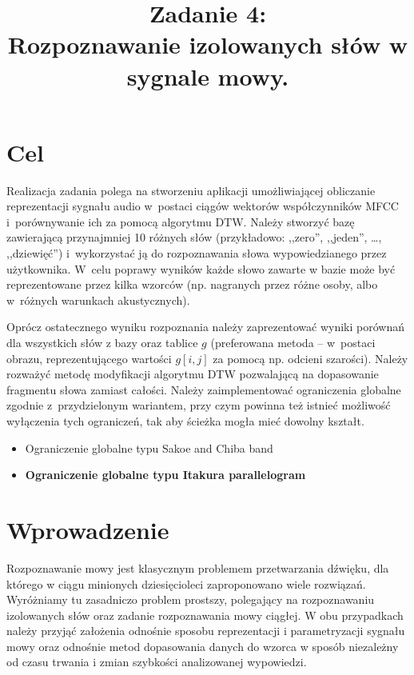 \documentclass{classrep}
\author{
  \studentinfo{Paweł Musiał}{178726} \and
  \studentinfo{Łukasz Michalski}{178724}
}
\title{Zadanie 4:\\  \textbf {Rozpoznawanie izolowanych słów w sygnale mowy.}}
\begin{document}
\maketitle

\addtocounter{footnote}{1}

\tableofcontents
\pagebreak
\section{Cel}
Realizacja zadania polega na stworzeniu aplikacji umożliwiającej obliczanie reprezentacji sygnału audio w~postaci ciągów wektorów współczynników MFCC i~porównywanie ich za pomocą algorytmu DTW. Należy stworzyć bazę zawierającą przynajmniej 10 różnych słów (przykładowo: ,,zero'', ,,jeden'', …, ,,dziewięć'') i~wykorzystać ją do rozpoznawania słowa wypowiedzianego przez użytkownika. W~celu poprawy wyników każde słowo zawarte w bazie może być reprezentowane przez kilka wzorców (np. nagranych przez różne osoby, albo w~różnych warunkach akustycznych).

Oprócz ostatecznego wyniku rozpoznania należy zaprezentować wyniki porównań dla wszystkich słów z bazy oraz tablice $g$ (preferowana metoda – w~postaci obrazu, reprezentującego wartości $g[i, j]$ za pomocą np. odcieni szarości). Należy rozważyć metodę modyfikacji algorytmu DTW pozwalającą na dopasowanie fragmentu słowa zamiast całości. Należy zaimplementować ograniczenia globalne zgodnie z~przydzielonym wariantem, przy czym powinna też istnieć możliwość wyłączenia tych ograniczeń, tak aby ścieżka mogła mieć dowolny kształt.
\begin{itemize}
\item Ograniczenie globalne typu Sakoe and Chiba band
\item \textbf{Ograniczenie globalne typu Itakura parallelogram}
\end{itemize}
\section{Wprowadzenie}
Rozpoznawanie mowy jest klasycznym problemem przetwarzania dźwięku, dla którego w ciągu minionych dziesięcioleci zaproponowano wiele rozwiązań. Wyróżniamy tu zasadniczo problem prostszy, polegający na rozpoznawaniu izolowanych słów oraz zadanie rozpoznawania mowy ciągłej. W obu przypadkach należy przyjąć założenia odnośnie sposobu reprezentacji i parametryzacji sygnału mowy oraz odnośnie metod dopasowania danych do wzorca w sposób niezależny od czasu trwania i zmian szybkości analizowanej wypowiedzi.
\end{document}
